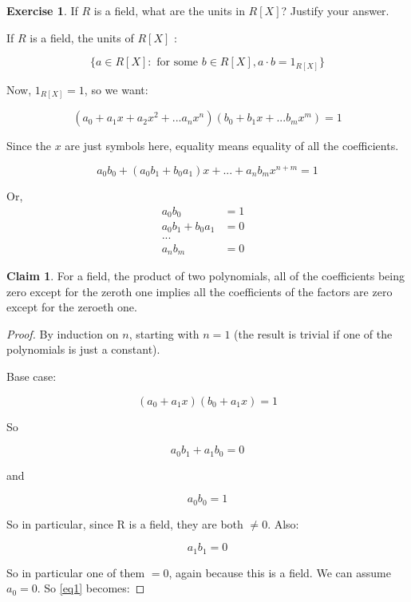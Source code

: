 \documentclass[11pt,oneside]{article}
\numberwithin{equation}{section}
\theoremstyle{definition}
\newtheorem{exercise}{Exercise}
\newtheorem*{claim}{Claim}
\begin{document}
\begin{exercise}
  If $R$ is a field, what are the units in $R[X]$?  Justify your answer.  
\end{exercise}
\begin{solution}
  If $R$ is a field, the units of $R[X]$ :

  $$
  \{ a \in R[X] : \textrm{ for some } b \in R[X], a \cdot b = 1 _ {R[X]} \}
  $$

  Now, $1_{R[X]} = 1$, so we want:

  $$
  (a_0 + a_1 x + a_2 x^2 + ... a_n x^n) ( b_0 + b_1 x + ... b_m x^m) = 1
  $$

  Since the $x$ are just symbols here, equality means equality of all the coefficients.

  $$
  a_0 b_0 + (a_0 b_1 + b_0 a_1 ) x + ... + a_n b_m x^ {n+m} = 1
  $$
   
  Or,
  \begin{align*}
    a_0 b_0 & = 1 & \\
    a_0 b_1 + b_0 a_1 & =0 \\
    ...& & \\
    a_n b_m & = 0
  \end{align*}

  \begin{claim}
    For a field, the product of two polynomials, all of the
    coefficients being zero except for the zeroth one implies all the
    coefficients of the factors are zero except for the zeroeth one.  
  \end{claim}
  \begin{proof}
    By induction on $n$, starting with $n = 1$ (the result is
    trivial if one of the polynomials is just a constant).

    Base case:

    $$
    (a_0 + a_1x) (b_0 + a_1x) =  1
    $$

    So

    \begin{equation}
      \label{eq1}
      a_0 b_1 + a_1 b_0 = 0
    \end{equation}

    and
    
    $$
    a_0 b_0 = 1
    $$
    
    So in particular, since R is a field, they are both $\neq 0$. Also: 

    $$
    a_1 b_1 = 0
    $$
    
    So in particular one of them $ = 0$, again because this is a field.
    We can assume $a_0 = 0$. So \ref{eq1} becomes:


\end{proof}
\end{solution}
\end{document}
